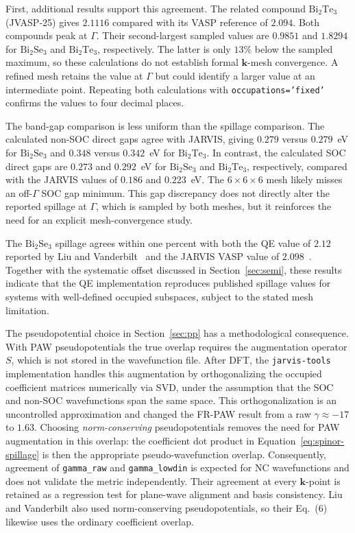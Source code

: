 \documentclass[11pt]{article}
\newcommand{\kk}{\mathbf{k}}
\begin{document}
First, additional results support this agreement. The related compound $\mathrm{Bi_2Te_3}$ (JVASP-25) gives
$2.1116$ compared with its VASP reference of $2.094$. Both compounds peak at $\Gamma$. Their
second-largest sampled values are $0.9851$ and $1.8294$ for $\mathrm{Bi_2Se_3}$ and
$\mathrm{Bi_2Te_3}$, respectively. The latter is only $13\%$ below the sampled maximum, so these
calculations do not establish formal $\kk$-mesh convergence. A refined mesh retains the value at
$\Gamma$ but could identify a larger value at an intermediate point. Repeating both calculations
with \texttt{occupations='fixed'} confirms the values to four decimal places.

The band-gap comparison is less uniform than the spillage comparison. The calculated non-SOC direct
gaps agree with JARVIS, giving $0.279$ versus $0.279$~eV for $\mathrm{Bi_2Se_3}$ and $0.348$ versus
$0.342$~eV for $\mathrm{Bi_2Te_3}$. In contrast, the calculated SOC direct gaps are $0.273$ and
$0.292$~eV for $\mathrm{Bi_2Se_3}$ and $\mathrm{Bi_2Te_3}$, respectively, compared with the JARVIS
values of $0.186$ and $0.223$~eV. The $6\times6\times6$ mesh
likely misses an off-$\Gamma$ SOC gap minimum. This gap discrepancy does not directly alter the
reported spillage at $\Gamma$, which is sampled by both meshes, but it reinforces the need for an
explicit mesh-convergence study.

The $\mathrm{Bi_2Se_3}$ spillage agrees within one percent with both the QE value of $2.12$ reported
by Liu and Vanderbilt~\cite{liu2014} and the JARVIS VASP value of $2.098$~\cite{choudhary2019}.
Together with the systematic offset
discussed in Section~\ref{sec:semi}, these results indicate that the QE implementation reproduces
published spillage values for systems with well-defined occupied subspaces, subject to the stated
mesh limitation.

The pseudopotential choice in Section~\ref{sec:pp} has a methodological consequence. With PAW pseudopotentials
the true overlap requires the augmentation operator $S$, which is not stored in the wavefunction
file. After DFT, the \texttt{jarvis-tools} implementation handles this augmentation by
orthogonalizing the occupied coefficient matrices numerically via SVD, under the assumption that the
SOC and non-SOC wavefunctions span the same space. This orthogonalization is an uncontrolled
approximation and changed the FR-PAW result from
a raw $\gamma\approx-17$ to $1.63$. Choosing \emph{norm-conserving} pseudopotentials removes the need
for PAW augmentation in this overlap: the coefficient dot product in
Equation~\eqref{eq:spinor-spillage} is then the appropriate pseudo-wavefunction overlap.
Consequently, agreement of \texttt{gamma\_raw} and
\texttt{gamma\_lowdin} is expected for NC wavefunctions and does not validate the metric
independently. Their agreement at every $\kk$-point is retained as a regression test for
plane-wave alignment and basis consistency. Liu and Vanderbilt also used norm-conserving
pseudopotentials, so their Eq.~(6) likewise uses the ordinary coefficient overlap.
\end{document}

